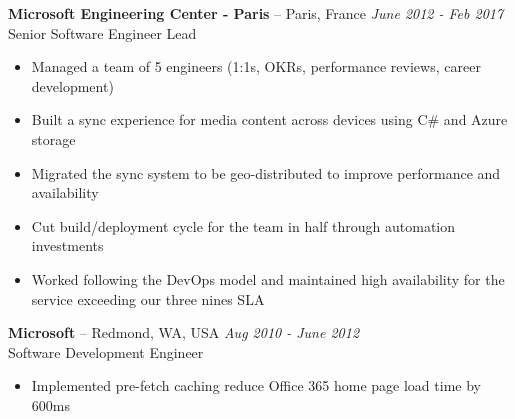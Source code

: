 \documentclass[]{rob-keim-resume}
\begin{document}
{\bf Microsoft Engineering Center - Paris} --  Paris, France \hfill {\sl June 2012 - Feb 2017} \\
Senior Software Engineer Lead
\begin{itemize} \itemsep -2pt
	\item Managed a team of 5 engineers (1:1s, OKRs, performance reviews, career development)	
	\item Built a sync experience for media content across devices using C\# and Azure storage
	\item Migrated the sync system to be geo-distributed to improve performance and availability
	\item Cut build/deployment cycle for the team in half through automation investments
	\item Worked following the DevOps model and maintained high availability for the service exceeding our three nines SLA
\end{itemize}

{\bf Microsoft} --  Redmond, WA, USA \hfill {\sl Aug 2010 - June 2012} \\
Software Development Engineer
\begin{itemize} \itemsep -2pt
	\item Implemented pre-fetch caching reduce Office 365 home page load time by 600ms
\end{itemize}


\end{document}
